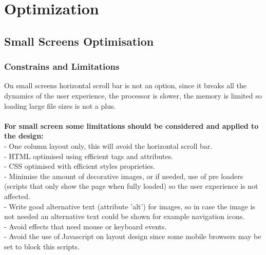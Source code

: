 \newpage
\chapter{Optimization}
\section{Small Screens Optimisation}

\subsection{Constrains and Limitations}
On small screens horizontal scroll bar is not an option, since it breaks all the dynamics of the user experience, the processor is slower, the memory is limited so loading large file sizes is not a plus.\\
\\
\noindent \textbf{For small screen some limitations should be considered and applied to the design:}\\
- One column layout only, this will avoid the horizontal scroll bar.\\
- HTML optimised using efficient tags and attributes.\\
- CSS optimised with efficient styles proprieties.\\
- Minimise the amount of decorative images, or if needed, use of pre loaders (scripts that only show the page when fully loaded) so the user experience is not affected.\\
- Write good alternative text (attribute 'alt')  for images, so in case the image is not needed an alternative text could be shown for example navigation icons.\\
- Avoid effects that need mouse or keyboard events.\\
- Avoid the use of Javascript on layout design since some mobile browsers may be set to block this scripts.


